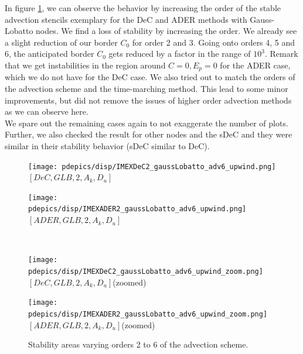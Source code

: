In figure \ref{fig: disp_alladv_GLB}, we can observe the behavior by increasing the order of the stable advection stencils exemplary for the DeC and ADER methods with Gauss-Lobatto nodes. We find a loss of stability by increasing the order. We already see a slight reduction of our border $C_0$ for order 2 and 3. Going onto orders 4, 5 and 6, the anticipated border $C_0$ gets reduced by a factor in the range of $10^3$. Remark that we get instabilities in the region around $C=0, E_p=0$ for the ADER case, which we do not have for the DeC case. We also tried out to match the orders of the advection scheme and the time-marching method. This lead to some minor improvements, but did not remove the issues of higher order advection methods as we can observe here.
\\
We spare out the remaining cases again to not exaggerate the number of plots. Further, we also checked the result for other nodes and the sDeC and they were similar in their stability behavior (sDeC similar to DeC). 
\begin{figure}
	\begin{minipage}[t]{0.45\textwidth}
		\centering
		\texttt{[image: pdepics/disp/IMEXDeC2\_gaussLobatto\_adv6\_upwind.png]}
		\small$[DeC, GLB,2,A_k,D_u]$\par
	\end{minipage}
	\begin{minipage}[t]{0.45\textwidth}
		\centering
		\texttt{[image: pdepics/disp/IMEXADER2\_gaussLobatto\_adv6\_upwind.png]}
		\small$[ADER, GLB,2,A_k,D_u]$\par
	\end{minipage}
	\\
	\begin{minipage}[t]{0.45\textwidth}
		\centering
		\texttt{[image: pdepics/disp/IMEXDeC2\_gaussLobatto\_adv6\_upwind\_zoom.png]}
		\small$[DeC, GLB,2,A_k,D_u]$(zoomed)\par
	\end{minipage}
	\begin{minipage}[t]{0.45\textwidth}
		\centering
		\texttt{[image: pdepics/disp/IMEXADER2\_gaussLobatto\_adv6\_upwind\_zoom.png]}
		\small$[ADER, GLB,2,A_k,D_u]$(zoomed)\par
	\end{minipage}
	\caption{Stability areas varying orders 2 to 6 of the advection scheme.}
	\label{fig: disp_alladv_GLB}
\end{figure}


